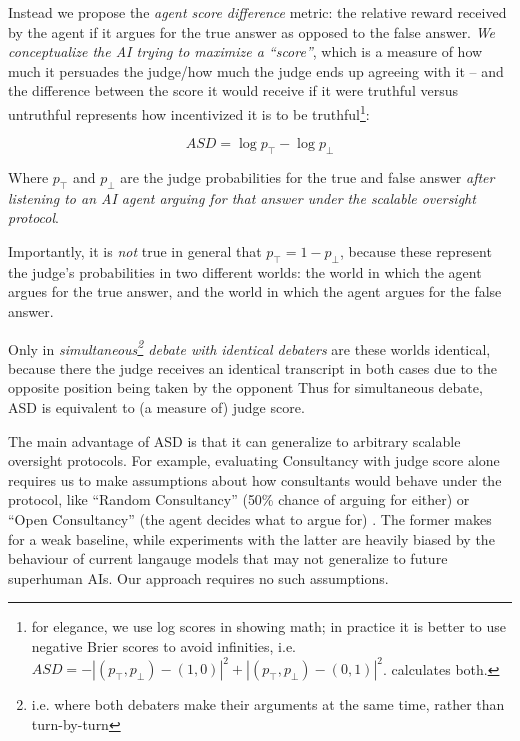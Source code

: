 Instead we propose the \emph{agent score difference} metric: the relative reward received by the agent if it argues for the true answer as opposed to the false answer. {\emph{We conceptualize the AI trying to maximize a ``score''}}, which is a measure of how much it persuades the judge/how much the judge ends up agreeing with it -- and the difference between the score it would receive if it were truthful versus untruthful represents how incentivized it is to be truthful\footnote{for elegance, we use log scores in showing math; in practice it is better to use negative Brier scores to avoid infinities, i.e. $ASD=-|(p_\top,p_\bot)-(1,0)|^2+|(p_\top,p_\bot)-(0,1)|^2$. \solib{} calculates both.}:

\[ASD=\log p_\top-\log p_\bot\]

Where \(p_\top\) and \(p_\bot\) are the judge probabilities for the true and false answer \emph{after listening to an AI agent arguing for that answer under the scalable oversight protocol}. 


Importantly, it is \emph{not} true in general that $p_\top=1-p_\bot$, because these represent the judge's probabilities in two different worlds: the world in which the agent argues for the true answer, and the world in which the agent argues for the false answer.

Only in \emph{simultaneous\footnote{i.e. where both debaters make their arguments at the same time, rather than turn-by-turn} debate with identical debaters} are these worlds identical, because there the judge receives an identical transcript in both cases due to the opposite position being taken by the opponent Thus for simultaneous debate, ASD is equivalent to (a measure of) judge score.

The main advantage of ASD is that it can generalize to arbitrary scalable oversight protocols. For example, evaluating Consultancy with judge score alone requires us to make assumptions about how consultants would behave under the protocol, like ``Random Consultancy'' (50\% chance of arguing for either) or ``Open Consultancy'' (the agent decides what to argue for) \citep{kentonScalableOversightWeak2024}. The former makes for a weak baseline, while experiments with the latter are heavily biased by the behaviour of current langauge models that may not generalize to future superhuman AIs. Our approach requires no such assumptions.

